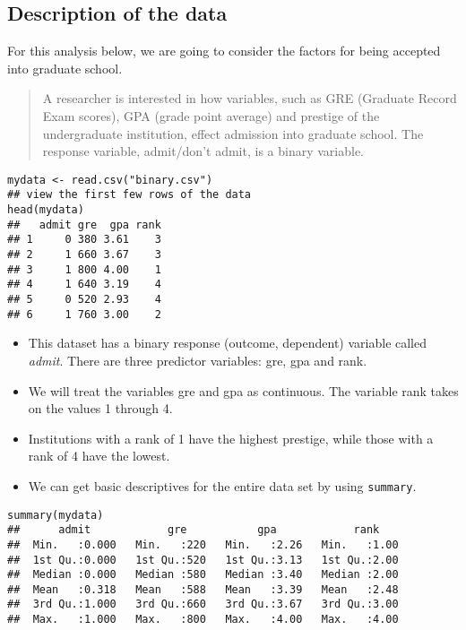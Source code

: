 \documentclass[]{article}
\begin{document}
\large
\tableofcontents
\newpage

\subsection{Description of the data}
For this analysis below, we are going to consider the factors for being accepted into graduate school.

\begin{quote}
A researcher is interested in how variables, such as GRE (Graduate Record Exam scores), GPA (grade point average) and prestige of the undergraduate institution, effect admission into graduate school. The response variable, admit/don't admit, is a binary variable.
\end{quote}
\begin{framed}
\begin{verbatim}
mydata <- read.csv("binary.csv")
## view the first few rows of the data
head(mydata)
##   admit gre  gpa rank
## 1     0 380 3.61    3
## 2     1 660 3.67    3
## 3     1 800 4.00    1
## 4     1 640 3.19    4
## 5     0 520 2.93    4
## 6     1 760 3.00    2
\end{verbatim}
\end{framed}
\begin{itemize}
\item This dataset has a binary response (outcome, dependent) variable called \textit{admit}. There are three predictor variables: gre, gpa and rank. 
\item We will treat the variables gre and gpa as continuous. The variable rank takes on the values 1 through 4. 
\item Institutions with a rank of 1 have the highest prestige, while those with a rank of 4 have the lowest.
\item We can get basic descriptives for the entire data set by using \texttt{summary}. 
\end{itemize}
\newpage
\begin{framed}
\begin{verbatim}
summary(mydata)
##      admit            gre           gpa            rank     
##  Min.   :0.000   Min.   :220   Min.   :2.26   Min.   :1.00  
##  1st Qu.:0.000   1st Qu.:520   1st Qu.:3.13   1st Qu.:2.00  
##  Median :0.000   Median :580   Median :3.40   Median :2.00  
##  Mean   :0.318   Mean   :588   Mean   :3.39   Mean   :2.48  
##  3rd Qu.:1.000   3rd Qu.:660   3rd Qu.:3.67   3rd Qu.:3.00  
##  Max.   :1.000   Max.   :800   Max.   :4.00   Max.   :4.00
\end{verbatim}
\end{framed}
\end{document}
